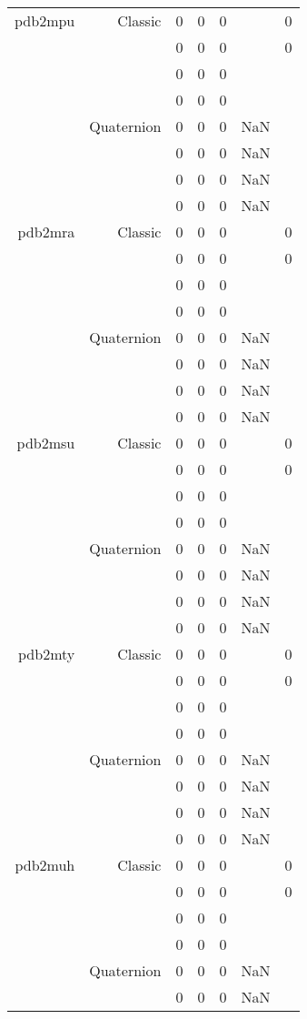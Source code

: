 \begin{xltabular}{\textwidth}{r|rcccSc}
pdb2mpu & Classic & 0 & 0 & 0 & & 0 \\
& & 0 & 0 & 0 & & 0 \\
& & 0 & 0 & 0 & & \\
& & 0 & 0 & 0 & & \\
& Quaternion & 0 & 0 & 0 & NaN & \\
& & 0 & 0 & 0 & NaN & \\
& & 0 & 0 & 0 & NaN & \\
& & 0 & 0 & 0 & NaN & \\ \addlinespace
pdb2mra & Classic & 0 & 0 & 0 & & 0 \\
& & 0 & 0 & 0 & & 0 \\
& & 0 & 0 & 0 & & \\
& & 0 & 0 & 0 & & \\
& Quaternion & 0 & 0 & 0 & NaN & \\
& & 0 & 0 & 0 & NaN & \\
& & 0 & 0 & 0 & NaN & \\
& & 0 & 0 & 0 & NaN & \\ \addlinespace
pdb2msu & Classic & 0 & 0 & 0 & & 0 \\
& & 0 & 0 & 0 & & 0 \\
& & 0 & 0 & 0 & & \\
& & 0 & 0 & 0 & & \\
& Quaternion & 0 & 0 & 0 & NaN & \\
& & 0 & 0 & 0 & NaN & \\
& & 0 & 0 & 0 & NaN & \\
& & 0 & 0 & 0 & NaN & \\ \addlinespace
pdb2mty & Classic & 0 & 0 & 0 & & 0 \\
& & 0 & 0 & 0 & & 0 \\
& & 0 & 0 & 0 & & \\
& & 0 & 0 & 0 & & \\
& Quaternion & 0 & 0 & 0 & NaN & \\
& & 0 & 0 & 0 & NaN & \\
& & 0 & 0 & 0 & NaN & \\
& & 0 & 0 & 0 & NaN & \\ \addlinespace
pdb2muh & Classic & 0 & 0 & 0 & & 0 \\
& & 0 & 0 & 0 & & 0 \\
& & 0 & 0 & 0 & & \\
& & 0 & 0 & 0 & & \\
& Quaternion & 0 & 0 & 0 & NaN & \\
& & 0 & 0 & 0 & NaN & \\

\end{xltabular}
